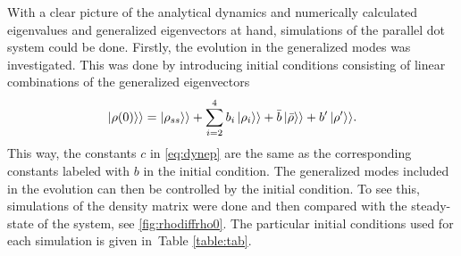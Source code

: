 \documentclass[../main.tex]{subfiles}
\begin{document}
With a clear picture of the analytical dynamics and numerically calculated eigenvalues and generalized eigenvectors at hand, simulations of the parallel dot system could be done. Firstly, the evolution in the generalized modes was investigated. This was done by introducing initial conditions consisting of linear combinations of the generalized eigenvectors
\begin{equation}\label{eq:ini}
    \ket{\rho(0)}\rangle = \ket{\rho_{ss}}\rangle + \sum_{i=2}^4 b_i\ket{\rho_i}\rangle + \bar b \ket{\bar\rho}\rangle + b'\ket{\rho'}\rangle.
\end{equation}
This way, the constants $c$ in \cref{eq:dynep} are the same as the corresponding constants labeled with $b$ in the initial condition. The generalized modes included in the evolution can then be controlled by the initial condition. To see this, simulations of the density matrix were done and then compared with the steady-state of the system, see \cref{fig:rhodiffrho0}. The particular initial conditions used for each simulation is given in~Table \ref{table:tab}.
\end{document}
